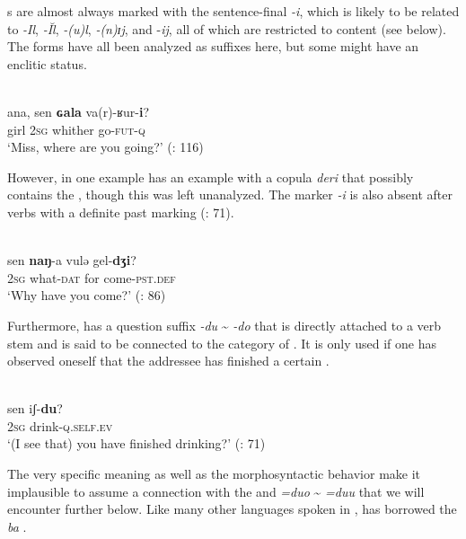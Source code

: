  s are almost always marked with the sentence-final \textit{-i}, which is likely to be related to  \textit{-Il},  \textit{-Ĭl},  \textit{-(u)l},  \textit{-(n)ɪj}, and  -\textit{ij}, all of which are restricted to content  (see below). The forms have all been analyzed as suffixes here, but some might have an enclitic status.

\ea%
    \label{ex:turk:5}
    \\
    \gll ana,  sen \textbf{{ɢala}} va(r)-ʁur-\textbf{{i}}?\\
    girl  2\textsc{sg}  whither  go-\textsc{fut-q}\\
    \glt ‘Miss, where are you going?’ (\citealt{LinLianyun1985}: 116)
    \z

However, in one example \citet[82]{LinLianyun1985} has an example with a copula \textit{deri} that possibly contains the , though this was left unanalyzed. The marker \textit{-i} is also absent after verbs with a definite past marking (\citealt{LinLianyun1985}: 71).

\ea%
    \label{ex:turk:6}
    \\
    \gll sen \textbf{{naŋ}}-a    vulə  gel-\textbf{{dʒi}}?\\
    2\textsc{sg}  what-\textsc{dat}  for  come-\textsc{pst}.\textsc{def}\\
    \glt ‘Why have you come?’ (\citealt{LinLianyun1985}: 86)
    \z

Furthermore,  has a question suffix \textit{-du} {\textasciitilde} \textit{-do} that is directly attached to a verb stem and is said to be connected to the category of . It is only used if one has observed oneself that the addressee has finished a certain .

\ea%
    \label{ex:turk:7}
    \\
    \gll sen  iʃ-\textbf{{du}}?\\
    2\textsc{sg}  drink-\textsc{q}.\textsc{self}.\textsc{ev}\\
    \glt ‘(I see that) you have finished drinking?’ (\citealt{LinLianyun1985}: 71)
    \z

The very specific meaning as well as the morphosyntactic behavior make it implausible to assume a connection with the  and   \textit{=duo} {\textasciitilde} \textit{=duu} that we will encounter further below. Like many other languages spoken in ,  has borrowed the   \textit{ba} .

